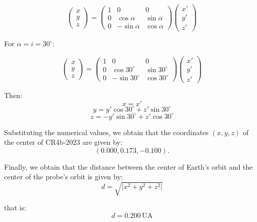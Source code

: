 \documentclass[11pt]{article}
\begin{document}
\begin{pproblem}
\begin{pssolution*}{}{}
\begin{alternativas}
            \[
            \begin{pmatrix}
            x \\
            y \\
            z
            \end{pmatrix}
            =
            \begin{pmatrix}
            1 & 0 & 0 \\
            0 & \cos \alpha & \sin \alpha \\
            0 & -\sin \alpha & \cos \alpha
            \end{pmatrix}
            \begin{pmatrix}
            x' \\
            y' \\
            z'
            \end{pmatrix}
            \] 

            For \(\alpha=i=30^\circ\):

            \[
            \begin{pmatrix}
            x \\
            y \\
            z
            \end{pmatrix}
            =
            \begin{pmatrix}
            1 & 0 & 0 \\
            0 & \cos 30^\circ & \sin 30^\circ \\
            0 & -\sin 30^\circ & \cos 30^\circ
            \end{pmatrix}
            \begin{pmatrix}
            x' \\
            y' \\
            z'
            \end{pmatrix}
            \]

            Then:
            \[
            x = x'
            \]
            \[
            y = y' \cos 30^\circ + z' \sin 30^\circ
            \]
            \[
            z = -y' \sin 30^\circ + z' \cos 30^\circ
            \]

            Substituting the numerical values, we obtain that the coordinates \((x, y, z)\) of the center of CR4b-2023 are given by:
            \[
            (0.000, 0.173, -0.100).
            \]

            Finally, we obtain that the distance between the center of Earth's orbit and the center of the probe's orbit is given by:
            \[
            d = \sqrt{\lvert x^2 + y^2 + z^2 \rvert}
            \]

            that is:
            \[
            \boxed{d = 0.200 \, \text{UA}}
            \]
        \end{alternativas}
    \end{pssolution*}
\end{pproblem}
\end{document}
